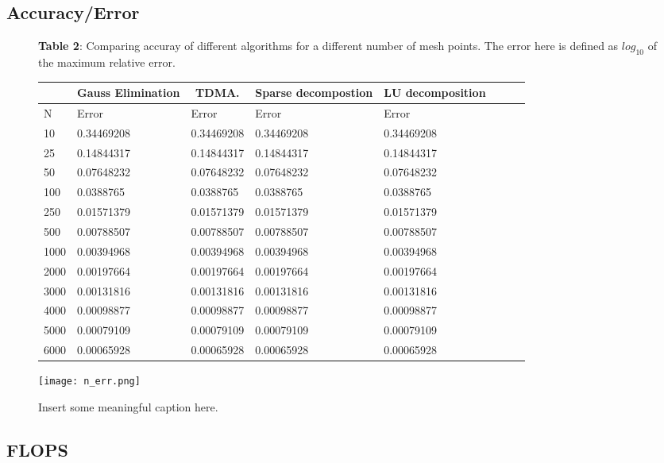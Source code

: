 \documentclass[11pt,a4paper,english,final]{article}
\numberwithin{equation}{section}
\begin{document}
\subsection{Accuracy/Error}

\begin{figure}
\textbf{Table 2}: Comparing accuray of different algorithms for a different number of mesh points. The error here is defined as $log_{10}$ of the maximum relative error. 

\begin{tabular}{|l|l|l|l|l|l|l|l|}
\hline
\multicolumn{1}{|c|}{ } & \multicolumn{1}{|c|}{Gauss Elimination} & \multicolumn{1}{|c|}{TDMA.} & \multicolumn{1}{|c|}{Sparse decompostion} & \multicolumn{1}{|c|}{LU decomposition}  \\
\hline
N & Error & Error & Error & Error  \\
\hline
10 & 0.34469208 &  0.34469208 &  0.34469208 &  0.34469208\\
25 & 0.14844317 &  0.14844317 &  0.14844317 &  0.14844317\\
50 & 0.07648232 &  0.07648232 &  0.07648232 &  0.07648232\\
100 & 0.0388765  &  0.0388765  &  0.0388765  &  0.0388765 \\
250 & 0.01571379 &  0.01571379 &  0.01571379 &  0.01571379\\
500 & 0.00788507 &  0.00788507 &  0.00788507 &  0.00788507\\
1000 & 0.00394968 &  0.00394968 &  0.00394968 &  0.00394968\\
2000 & 0.00197664 &  0.00197664 &  0.00197664 &  0.00197664\\
3000 & 0.00131816 &  0.00131816 &  0.00131816 &  0.00131816\\
4000 & 0.00098877 &  0.00098877 &  0.00098877 &  0.00098877\\
5000 & 0.00079109 &  0.00079109 &  0.00079109 &  0.00079109\\
6000 & 0.00065928 &  0.00065928 &  0.00065928 &  0.00065928\\
\hline
\end{tabular}
\end{figure}

\begin{figure}[h!]
\centering
  \texttt{[image: n\_err.png]}
  \caption{Insert some meaningful caption here. }
\end{figure}


\subsection{FLOPS}
\end{document}
